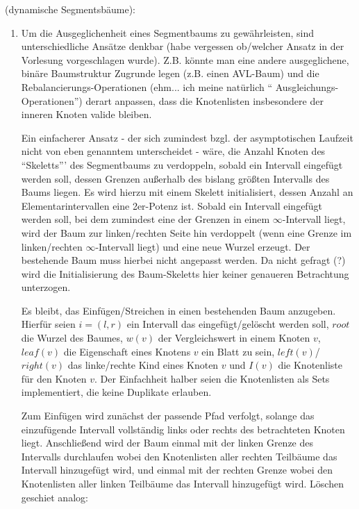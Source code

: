 \documentclass[a4paper, titlepage=false, parskip=full-, 10pt]{scrartcl}
\newcounter{tasknbr}
\newenvironment{task}[1]{{\bf Aufgabe \arabic {tasknbr}\stepcounter{tasknbr}} (#1):\begin{enumerate}}{\end{enumerate}}
\begin{document}
\newpage
\begin{task}{dynamische Segmentsbäume}
\item[]
Um die Ausgeglichenheit eines Segmentbaums zu gewährleisten, sind unterschiedliche Ansätze denkbar (habe vergessen ob/welcher Ansatz in der Vorlesung vorgeschlagen wurde). Z.B. könnte man eine andere ausgeglichene, binäre Baumstruktur Zugrunde legen (z.B. einen AVL-Baum) und die Rebalancierungs-Operationen (ehm... ich meine natürlich "`
Ausgleichungs-Operationen"') derart anpassen, dass die Knotenlisten insbesondere der inneren Knoten valide bleiben.

Ein einfacherer Ansatz - der sich zumindest bzgl. der asymptotischen Laufzeit nicht von eben genanntem unterscheidet - wäre, die Anzahl Knoten des "`Skeletts"'' des Segmentbaums zu verdoppeln, sobald ein Intervall eingefügt werden soll, dessen Grenzen außerhalb des bislang größten Intervalls des Baums liegen. Es wird hierzu mit einem Skelett initialisiert, dessen Anzahl an Elementarintervallen eine 2er-Potenz ist. Sobald ein Intervall eingefügt werden soll, bei dem zumindest eine der Grenzen in einem $\infty$-Intervall liegt, wird der Baum zur linken/rechten Seite hin verdoppelt (wenn eine Grenze im linken/rechten $\infty$-Intervall liegt) und eine neue Wurzel erzeugt. Der bestehende Baum muss hierbei nicht angepasst werden. Da nicht gefragt (?) wird die Initialisierung des Baum-Skeletts hier keiner genaueren Betrachtung unterzogen.

Es bleibt, das Einfügen/Streichen in einen bestehenden Baum anzugeben. Hierfür seien $i=(l,r)$ ein Intervall das eingefügt/gelöscht werden soll, $root$ die Wurzel des Baumes, $w(v)$ der Vergleichswert in einem Knoten $v$, $leaf(v)$ die Eigenschaft eines Knotens $v$ ein Blatt zu sein, $left(v)$/$right(v)$ das linke/rechte Kind eines Knoten $v$ und $I(v)$ die Knotenliste für den Knoten $v$. Der Einfachheit halber seien die Knotenlisten als Sets implementiert, die keine Duplikate erlauben.

Zum Einfügen wird zunächst der passende Pfad verfolgt, solange das einzufügende Intervall vollständig links oder rechts des betrachteten Knoten liegt. Anschließend wird der Baum einmal mit der linken Grenze des Intervalls durchlaufen wobei den Knotenlisten aller rechten Teilbäume das Intervall hinzugefügt wird, und einmal mit der rechten Grenze wobei den Knotenlisten aller linken Teilbäume das Intervall hinzugefügt wird. Löschen geschiet analog:


\end{task}
\end{document}
